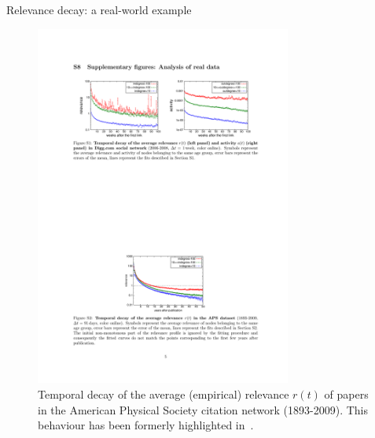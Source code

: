 \begin{frame}{Relevance decay: a real-world example}
    \begin{figure}
        \includegraphics[width=0.75\textwidth]{figures/RelevanceDecayAPS}
        \caption{Temporal decay of the average (empirical) relevance $r(t)$ of papers in the American Physical Society citation network (1893-2009).
        This behaviour has been formerly highlighted in~\cite{Medo2011}.}
    \end{figure}
\end{frame}

